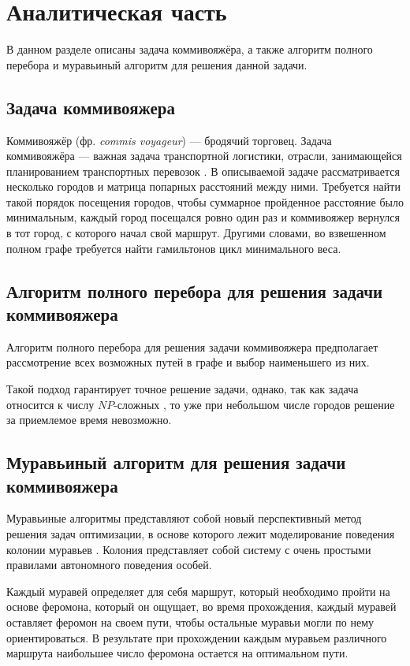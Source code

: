 \chapter{Аналитическая часть}
В данном разделе описаны задача коммивояжёра, а также алгоритм полного перебора и муравьиный алгоритм для решения данной задачи.

\section{Задача коммивояжера}
Коммивояжёр (фр. \textit{commis voyageur}) — бродячий торговец. Задача коммивояжёра — важная задача транспортной логистики, отрасли, занимающейся планированием транспортных перевозок \cite{Commie}. В описываемой задаче рассматривается несколько городов  и матрица попарных расстояний между ними. Требуется найти такой порядок  посещения  городов,  чтобы  суммарное  пройденное  расстояние было минимальным, каждый город посещался ровно один раз и  коммивояжер  вернулся  в  тот  город,  с  которого  начал  свой  маршрут.  Другими  словами,  во  взвешенном  полном  графе  требуется найти гамильтонов цикл минимального веса.

\section{Алгоритм полного перебора для решения задачи коммивояжера}
Алгоритм полного перебора для решения задачи коммивояжера предполагает рассмотрение всех возможных путей в графе и выбор наименьшего из них.

Такой подход гарантирует точное решение задачи, однако, так как задача относится к числу $NP$-сложных \cite{np_tasks}, то уже при небольшом числе городов решение за приемлемое время невозможно.

\section{Муравьиный алгоритм для решения задачи коммивояжера}
Муравьиные алгоритмы представляют собой новый перспективный метод решения задач оптимизации, в основе которого лежит моделирование поведения колонии муравьев \cite{Ulianov}. Колония представляет собой систему с очень простыми правилами автономного поведения особей.

Каждый муравей определяет для себя маршрут, который необходимо пройти на основе феромона, который он ощущает, во время прохождения, каждый муравей оставляет феромон на своем пути, чтобы остальные муравьи могли по нему ориентироваться. В результате при прохождении каждым муравьем различного маршрута наибольшее число феромона остается на оптимальном пути.

